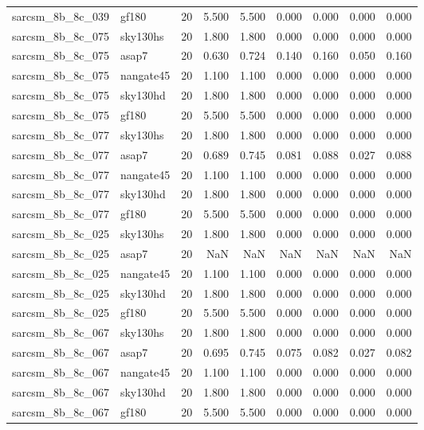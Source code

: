\begin{tabular}{llrrrrrrr}
sarcsm\_8b\_8c\_039 & gf180 & 20 & 5.500 & 5.500 & 0.000 & 0.000 & 0.000 & 0.000 \\
sarcsm\_8b\_8c\_075 & sky130hs & 20 & 1.800 & 1.800 & 0.000 & 0.000 & 0.000 & 0.000 \\
sarcsm\_8b\_8c\_075 & asap7 & 20 & 0.630 & 0.724 & 0.140 & 0.160 & 0.050 & 0.160 \\
sarcsm\_8b\_8c\_075 & nangate45 & 20 & 1.100 & 1.100 & 0.000 & 0.000 & 0.000 & 0.000 \\
sarcsm\_8b\_8c\_075 & sky130hd & 20 & 1.800 & 1.800 & 0.000 & 0.000 & 0.000 & 0.000 \\
sarcsm\_8b\_8c\_075 & gf180 & 20 & 5.500 & 5.500 & 0.000 & 0.000 & 0.000 & 0.000 \\
sarcsm\_8b\_8c\_077 & sky130hs & 20 & 1.800 & 1.800 & 0.000 & 0.000 & 0.000 & 0.000 \\
sarcsm\_8b\_8c\_077 & asap7 & 20 & 0.689 & 0.745 & 0.081 & 0.088 & 0.027 & 0.088 \\
sarcsm\_8b\_8c\_077 & nangate45 & 20 & 1.100 & 1.100 & 0.000 & 0.000 & 0.000 & 0.000 \\
sarcsm\_8b\_8c\_077 & sky130hd & 20 & 1.800 & 1.800 & 0.000 & 0.000 & 0.000 & 0.000 \\
sarcsm\_8b\_8c\_077 & gf180 & 20 & 5.500 & 5.500 & 0.000 & 0.000 & 0.000 & 0.000 \\
sarcsm\_8b\_8c\_025 & sky130hs & 20 & 1.800 & 1.800 & 0.000 & 0.000 & 0.000 & 0.000 \\
sarcsm\_8b\_8c\_025 & asap7 & 20 & NaN & NaN & NaN & NaN & NaN & NaN \\
sarcsm\_8b\_8c\_025 & nangate45 & 20 & 1.100 & 1.100 & 0.000 & 0.000 & 0.000 & 0.000 \\
sarcsm\_8b\_8c\_025 & sky130hd & 20 & 1.800 & 1.800 & 0.000 & 0.000 & 0.000 & 0.000 \\
sarcsm\_8b\_8c\_025 & gf180 & 20 & 5.500 & 5.500 & 0.000 & 0.000 & 0.000 & 0.000 \\
sarcsm\_8b\_8c\_067 & sky130hs & 20 & 1.800 & 1.800 & 0.000 & 0.000 & 0.000 & 0.000 \\
sarcsm\_8b\_8c\_067 & asap7 & 20 & 0.695 & 0.745 & 0.075 & 0.082 & 0.027 & 0.082 \\
sarcsm\_8b\_8c\_067 & nangate45 & 20 & 1.100 & 1.100 & 0.000 & 0.000 & 0.000 & 0.000 \\
sarcsm\_8b\_8c\_067 & sky130hd & 20 & 1.800 & 1.800 & 0.000 & 0.000 & 0.000 & 0.000 \\
sarcsm\_8b\_8c\_067 & gf180 & 20 & 5.500 & 5.500 & 0.000 & 0.000 & 0.000 & 0.000 \\

\end{tabular}
